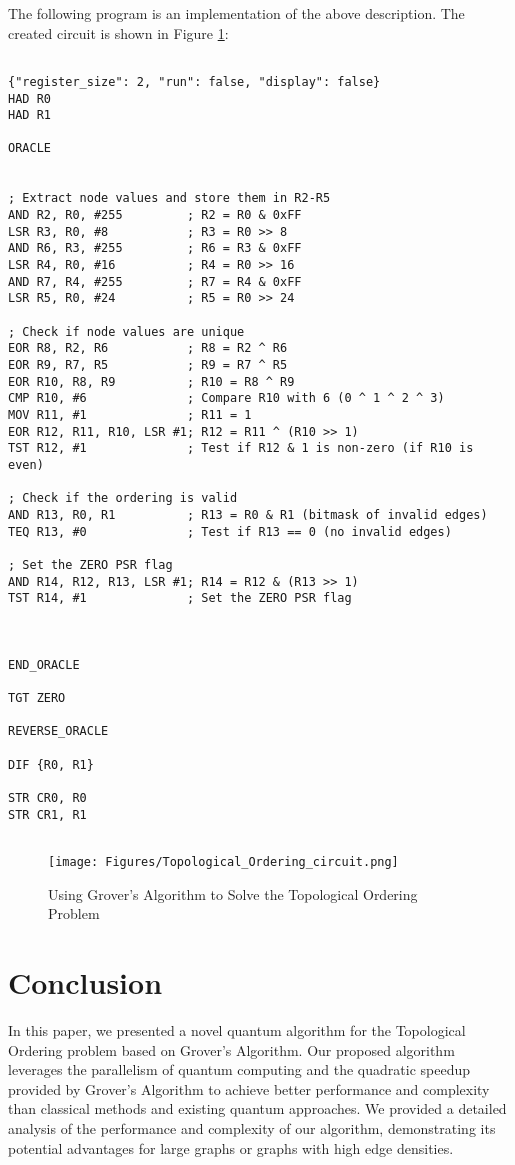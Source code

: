 The following program is an implementation of the above description. The created circuit is shown in Figure \ref{fig:Topological_Ordering}:

\begin{lstlisting}

{"register_size": 2, "run": false, "display": false}
HAD R0
HAD R1

ORACLE


; Extract node values and store them in R2-R5
AND R2, R0, #255         ; R2 = R0 & 0xFF
LSR R3, R0, #8           ; R3 = R0 >> 8
AND R6, R3, #255         ; R6 = R3 & 0xFF
LSR R4, R0, #16          ; R4 = R0 >> 16
AND R7, R4, #255         ; R7 = R4 & 0xFF
LSR R5, R0, #24          ; R5 = R0 >> 24

; Check if node values are unique
EOR R8, R2, R6           ; R8 = R2 ^ R6
EOR R9, R7, R5           ; R9 = R7 ^ R5
EOR R10, R8, R9          ; R10 = R8 ^ R9
CMP R10, #6              ; Compare R10 with 6 (0 ^ 1 ^ 2 ^ 3)
MOV R11, #1              ; R11 = 1
EOR R12, R11, R10, LSR #1; R12 = R11 ^ (R10 >> 1)
TST R12, #1              ; Test if R12 & 1 is non-zero (if R10 is even)

; Check if the ordering is valid
AND R13, R0, R1          ; R13 = R0 & R1 (bitmask of invalid edges)
TEQ R13, #0              ; Test if R13 == 0 (no invalid edges)

; Set the ZERO PSR flag
AND R14, R12, R13, LSR #1; R14 = R12 & (R13 >> 1)
TST R14, #1              ; Set the ZERO PSR flag



END_ORACLE

TGT ZERO

REVERSE_ORACLE

DIF {R0, R1}

STR CR0, R0
STR CR1, R1


\end{lstlisting}

\begin{figure}[htp]
    \centering
    \texttt{[image: Figures/Topological\_Ordering\_circuit.png]}
    \caption{Using Grover's Algorithm to Solve the Topological Ordering Problem}
    \label{fig:Topological_Ordering}
\end{figure}

\section{Conclusion}

In this paper, we presented a novel quantum algorithm for the Topological Ordering problem based on Grover's Algorithm. Our proposed algorithm leverages the parallelism of quantum computing and the quadratic speedup provided by Grover's Algorithm to achieve better performance and complexity than classical methods and existing quantum approaches. We provided a detailed analysis of the performance and complexity of our algorithm, demonstrating its potential advantages for large graphs or graphs with high edge densities.

